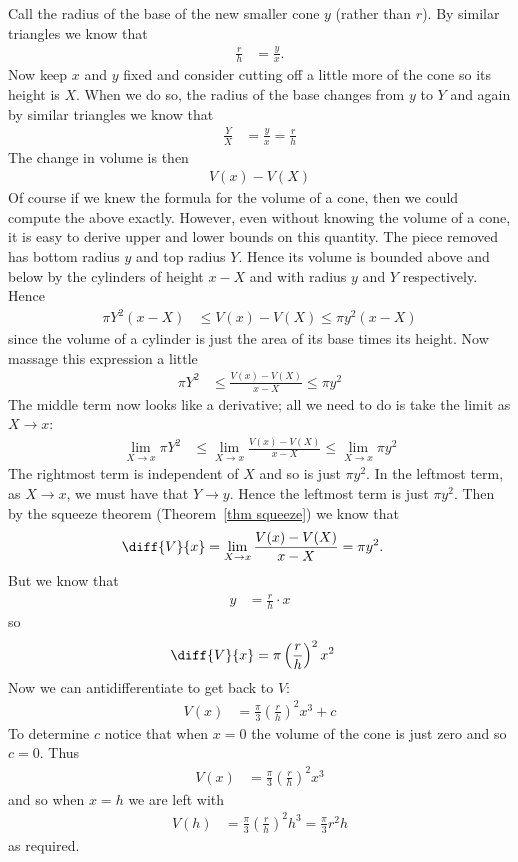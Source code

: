 \begin{eg}
Call the radius of the base of the new smaller cone $y$ (rather than $r$). By
similar triangles we know that
\begin{align*}
  \frac{r}{h} &= \frac{y}{x}.
\end{align*}
Now keep $x$ and $y$ fixed and consider cutting off a little more of the cone so
its height is $X$. When we do so, the radius of the base changes from $y$ to
$Y$ and again by similar triangles we know that
\begin{align*}
  \frac{Y}{X} &= \frac{y}{x} = \frac{r}{h}
\end{align*}
The change in volume is then
\begin{align*}
  V(x) - V(X)
\end{align*}
Of course if we knew the formula for the volume of a cone, then we could compute
the above exactly. However, even without knowing the volume of a cone, it is
easy to derive upper and lower bounds on this quantity. The piece removed
has bottom radius $y$ and top radius $Y$. Hence its volume is bounded above
and below by the cylinders of height $x-X$ and with radius $y$ and $Y$
respectively. Hence
\begin{align*}
  \pi Y^2 (x-X) & \leq V(x)-V(X) \leq \pi y^2 (x-X)
\end{align*}
since the volume of a cylinder is just the area of its base times its height. Now massage
this expression a little
\begin{align*}
  \pi Y^2 & \leq \frac{V(x)-V(X)}{x-X} \leq \pi y^2
\end{align*}
The middle term now looks like a derivative; all we need to do is take the limit
as $X \to x$:
\begin{align*}
  \lim_{X\to x} \pi Y^2 & \leq \lim_{X\to x} \frac{V(x)-V(X)}{x-X} \leq
\lim_{X\to x} \pi y^2
\end{align*}
The rightmost term is independent of $X$ and so is just $\pi y^2$. In the
leftmost term, as $X \to x$, we must have that $Y \to y$. Hence the leftmost
term is just $\pi y^2$. Then by the squeeze theorem (Theorem~\ref{thm squeeze})
we know that
\begin{align*}
  \diff{V}{x} = \lim_{X\to x} \frac{V(x)-V(X)}{x-X} &= \pi y^2.
\end{align*}
But we know that
\begin{align*}
  y &= \frac{r}{h} \cdot x
\end{align*}
so
\begin{align*}
  \diff{V}{x} &= \pi \left( \frac{r}{h} \right)^2 x^2
\end{align*}
Now we can antidifferentiate to get back to $V$:
\begin{align*}
  V(x) &= \frac{\pi}{3} \left( \frac{r}{h} \right)^2 x^3 + c
\end{align*}
To determine $c$ notice that when $x=0$ the volume of the cone is just zero and
so $c=0$. Thus
\begin{align*}
V(x) &= \frac{\pi}{3} \left( \frac{r}{h} \right)^2 x^3
\end{align*}
and so when $x=h$ we are left with
\begin{align*}
  V(h) &= \frac{\pi}{3} \left( \frac{r}{h} \right)^2 h^3 = \frac{\pi}{3} r^2 h
\end{align*}
as required.
\end{eg}
